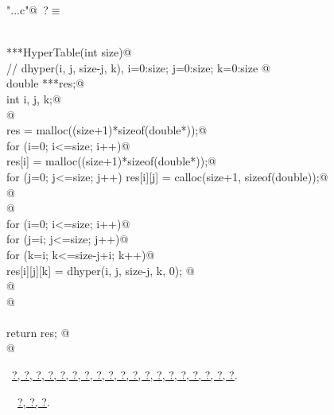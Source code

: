\documentclass[reqno]{amsart}
\renewcommand{\NWtarget}[2]{\hypertarget{#1}{#2}}
\renewcommand{\NWlink}[2]{\hyperlink{#1}{#2}}
\begin{document}
\begin{flushleft} \small\label{scrap22}\raggedright\small
\NWtarget{nuweb?}{} \verb@"..\src\ReprodCalcs.c"@\nobreak\ {\footnotesize {?}}$\equiv$
\vspace{-1ex}
\begin{list}{}{} \item
\mbox{}\verb@@\\
\mbox{}\verb@double ***HyperTable(int size){@\\
\mbox{}\verb@// dhyper(i, j, size-j, k), i=0:size; j=0:size; k=0:size        @\\
\mbox{}\verb@ double ***res;@\\
\mbox{}\verb@ int i, j, k;@\\
\mbox{}\verb@ @\\
\mbox{}\verb@ res = malloc((size+1)*sizeof(double*));@\\
\mbox{}\verb@ for (i=0; i<=size; i++){@\\
\mbox{}\verb@         res[i] = malloc((size+1)*sizeof(double*));@\\
\mbox{}\verb@         for (j=0; j<=size; j++) res[i][j] = calloc(size+1, sizeof(double));@\\
\mbox{}\verb@ }@\\
\mbox{}\verb@ @\\
\mbox{}\verb@ for (i=0; i<=size; i++){@\\
\mbox{}\verb@         for (j=i; j<=size; j++){@\\
\mbox{}\verb@                 for (k=i; k<=size-j+i; k++)@\\
\mbox{}\verb@                         res[i][j][k] = dhyper(i, j, size-j, k, 0); @\\
\mbox{}\verb@                 }@\\
\mbox{}\verb@         }@\\
\mbox{}\verb@@\\
\mbox{}\verb@ return res;    @\\
\mbox{}\verb@}@\\
\mbox{}\verb@@{\NWsep}
\end{list}
\vspace{-1.5ex}
\footnotesize
\begin{list}{}{\setlength{\itemsep}{-\parsep}\setlength{\itemindent}{-\leftmargin}}
\item \NWtxtFileDefBy\ \NWlink{nuweb?}{?}\NWlink{nuweb?}{, ?}\NWlink{nuweb?}{, ?}\NWlink{nuweb?}{, ?}\NWlink{nuweb?}{, ?}\NWlink{nuweb?}{, ?}\NWlink{nuweb?}{, ?}\NWlink{nuweb?}{, ?}\NWlink{nuweb?}{, ?}\NWlink{nuweb?}{, ?}\NWlink{nuweb?}{, ?}\NWlink{nuweb?}{, ?}\NWlink{nuweb?}{, ?}\NWlink{nuweb?}{, ?}\NWlink{nuweb?}{, ?}\NWlink{nuweb?}{, ?}\NWlink{nuweb?}{, ?}\NWlink{nuweb?}{, ?}\NWlink{nuweb?}{, ?}.
\item \NWtxtIdentsDefed\nobreak\  \verb@HyperTable@\nobreak\ \NWlink{nuweb?}{?}\NWlink{nuweb?}{, ?}\NWlink{nuweb?}{, ?}.
\item{}
\end{list}
\vspace{4ex}
\end{flushleft}
\end{document}
